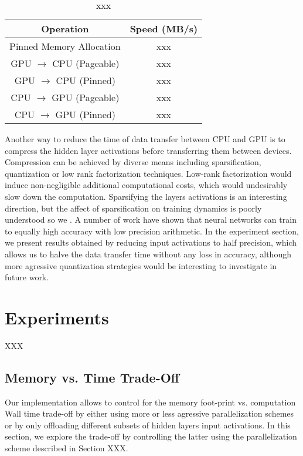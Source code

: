 \documentclass[11pt,onecolumn]{article}
\begin{document}
\begin{table*}[t]
\begin{center}
\begin{tabular}{ c c }	
\hline
Operation     & Speed (MB/s)  \\
\hline
Pinned Memory Allocation     		      &  xxx \\
GPU $\rightarrow$ CPU (Pageable)	&  xxx \\
GPU $\rightarrow$ CPU (Pinned)	     &  xxx \\
CPU $\rightarrow$ GPU (Pageable)	&  xxx \\
CPU $\rightarrow$ GPU (Pinned)	     &  xxx \\
\hline
\end{tabular}
\caption{xxx}
\end{center}
\end{table*}

Another way to reduce the time of data transfer between CPU and GPU is to compress
the hidden layer activations before transferring them between devices.
Compression can be achieved by diverse means including sparsification, 
quantization or low rank factorization techniques.
Low-rank factorization would induce non-negligible additional computational costs, 
which would undesirably slow down the computation.
Sparsifying the layers activations is an interesting direction, but the affect of sparsification on 
training dynamics is poorly understood so we .
A number of work have shown that neural networks can train 
to equally high accuracy with low precision arithmetic.
In the experiment section, we present results obtained by reducing input activations to half precision,
which allows us to halve the data transfer time without any loss in accuracy,
although more agressive quantization strategies would be interesting to investigate in future work.

\section{Experiments}

XXX

\subsection{Memory vs. Time Trade-Off}

Our implementation allows to control for the memory foot-print vs. computation Wall time trade-off by 
either using more or less agressive parallelization schemes 
or by only offloading different subsets of hidden layers input activations.
In this section, we explore the trade-off by controlling the latter 
using the parallelization scheme described in Section XXX.
\end{document}
